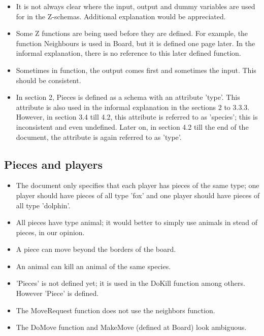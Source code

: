 \documentclass[a4paper,11pt]{article}
\begin{document}
\begin{itemize}
        \item It is not always clear where the input, output and dummy variables are used for in the Z-schemas. Additional explanation would be appreciated.
	   \item Some Z functions are being used before they are defined. For example, the function Neighbours is used in Board, but it is defined one page later. In the informal explanation, there is no reference to this later defined function.
        \item Sometimes in function, the output comes first and sometimes the input. This should be consistent.
        \item In section 2, Pieces is defined as a schema with an attribute 'type'. This attribute is also used in the informal explanation in the sections 2 to 3.3.3. However, in section 3.4 till 4.2, this attribute is referred to as 'species'; this is inconsistent and even undefined. Later on, in section 4.2 till the end of the document, the attribute is again referred to as 'type'.
   \end{itemize}

    \subsection{Pieces and players}
    \begin{itemize}
        \item The document only specifies that each player has pieces of the same type; one player should have pieces of all type 'fox' and one player should have pieces of all type 'dolphin'.
        \item All pieces have type animal; it would better to simply use animals in stead of pieces, in our opinion.
        \item A piece can move beyond the borders of the board.
        \item An animal can kill an animal of the same species.
        \item 'Pieces' is not defined yet; it is used in the DoKill function among others. However 'Piece' is defined.
        \item The MoveRequest function does not use the neighbors function.
        \item The DoMove function and MakeMove (defined at Board) look ambiguous.
    \end{itemize}
\end{document}
